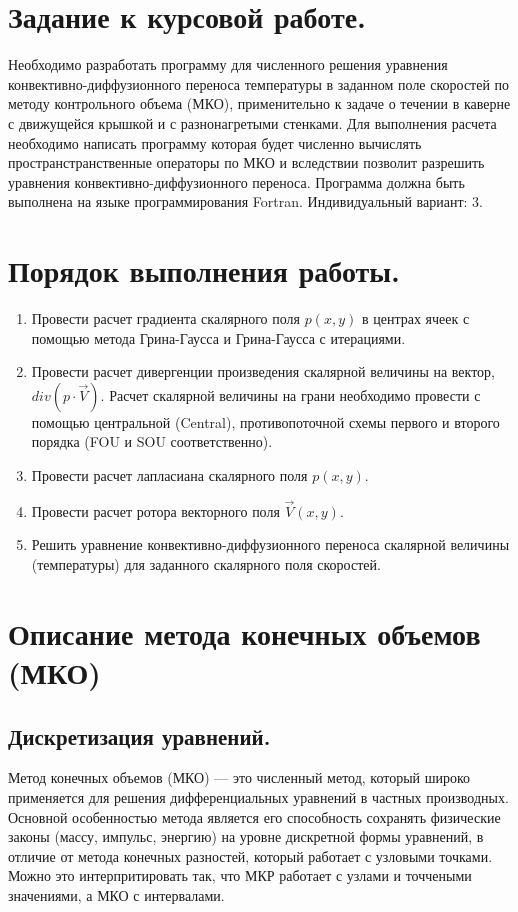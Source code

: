 \section{Задание к курсовой работе.}
Необходимо разработать программу для численного решения уравнения конвективно-диффузионного переноса температуры в заданном поле скоростей по методу контрольного объема (МКО), применительно к задаче о течении в каверне с движущейся крышкой и с разнонагретыми стенками. Для выполнения расчета необходимо написать программу которая будет численно вычислять пространстранственные операторы по МКО и вследствии позволит разрешить уравнения конвективно-диффузионного переноса. Программа должна быть выполнена на языке программирования Fortran. Индивидуальный вариант: 3.

\section{ Порядок выполнения работы.}

\begin{enumerate}
    \item Провести расчет градиента скалярного поля $p(x,y)$ в центрах ячеек с
    помощью метода Грина-Гаусса и Грина-Гаусса с итерациями.
    \item Провести расчет дивергенции произведения скалярной величины на вектор, $div(p\cdot\vec{V})$. Расчет скалярной величины на грани необходимо провести с помощью центральной (Central), противопоточной схемы первого и второго порядка (FOU и SOU соответственно).
    \item Провести расчет лапласиана скалярного поля $p(x,y)$.
    \item Провести расчет ротора векторного поля $\vec{V}(x,y)$.
    \item Решить уравнение конвективно-диффузионного переноса скалярной величины (температуры) для заданного скалярного поля скоростей.
\end{enumerate}


\section{Описание метода конечных объемов (МКО)}
\subsection{Дискретизация уравнений.}
Метод конечных объемов (МКО) — это численный метод, который широко применяется для решения дифференциальных уравнений в частных производных. Основной особенностью метода является его способность сохранять физические законы (массу, импульс, энергию) на уровне дискретной формы уравнений, в отличие от метода конечных разностей, который работает с узловыми точками. Можно это интерпритировать так, что МКР работает с узлами и точчеными значениями, а МКО с интервалами.

